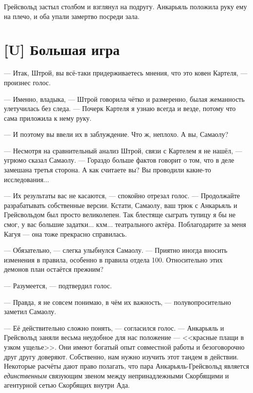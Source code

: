 Грейсвольд застыл столбом и взглянул на подругу.
Анкарьяль положила руку ему на плечо, и оба упали замертво посреди зала.

\section{[U] Большая игра}

\textspace

--- Итак, Штрой, вы всё-таки придерживаетесь мнения, что это ковен Картеля, --- произнес голос.

--- Именно, владыка, --- Штрой говорила чётко и размеренно, былая жеманность улетучилась без следа.
--- Почерк Картеля я узнаю всегда и везде, потому что сама приложила к нему руку.

--- И поэтому вы ввели их в заблуждение.
Что ж, неплохо.
А вы, Самаолу?

--- Несмотря на сравнительный анализ Штрой, связи с Картелем я не нашёл, --- угрюмо сказал Самаолу.
--- Гораздо больше фактов говорит о том, что в деле замешана третья сторона.
А как считаете вы?
Вы проводили какие-то исследования...

--- Их результаты вас не касаются, --- спокойно отрезал голос.
--- Продолжайте разрабатывать собственные версии.
Кстати, Самаолу, ваш трюк с Анкарьяль и Грейсвольдом был просто великолепен.
Так блестяще сыграть тупицу я бы не смог, у вас большие задатки... кхм... театрального актёра.
Поблагодарите за меня Кагуя --- она тоже прекрасно справилась.

--- Обязательно, --- слегка улыбнулся Самаолу.
--- Приятно иногда вносить изменения в правила, особенно в правила отдела 100.
Относительно этих демонов план остаётся прежним?

--- Разумеется, --- подтвердил голос.

--- Правда, я не совсем понимаю, в чём их важность, --- полувопросительно заметил Самаолу.

--- Её действительно сложно понять, --- согласился голос.
--- Анкарьяль и Грейсвольд заняли весьма неудобное для нас положение --- <<красные плащи в узком ущелье>>\FM.
Они имеют богатый опыт совместной работы и безоговорочно друг другу доверяют.
Собственно, нам нужно изучить этот тандем в действии.
Некоторые расчёты дают право полагать, что пара Анкарьяль-Грейсвольд является \emph{единственным} связующим звеном между непринадлежными Скорбящими и агентурной сетью Скорбящих внутри Ада.

